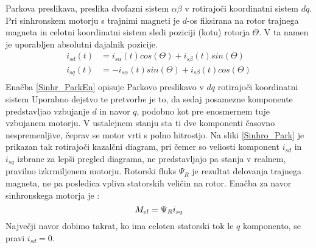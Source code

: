 \documentclass[a4paper,twoside,openright,12pt]{book}
\begin{document}
Parkova preslikava, preslika dvofazni sistem $\alpha \beta$ v rotirajoči koordinatni sistem $dq$. Pri sinhronskem motorju s trajnimi magneti je $d$-os fiksirana na rotor trajnega magneta in celotni koordinatni sistem sledi poziciji (kotu) rotorja $\Theta$. V ta namen je uporabljen absolutni dajalnik pozicije.\\
\begin{equation} \label{Sinhr_ParkEn}
\begin{aligned}
i_{sd}(t) &= i_{s\alpha}(t)cos(\Theta)+i_{s\beta}(t)sin(\Theta)\\[5pt]
i_{sq}(t) &= -i_{s\alpha}(t)sin(\Theta)+i_{s\beta}(t)cos(\Theta)\\[5pt]
\end{aligned}
\end{equation}
Enačba \ref{Sinhr_ParkEn} opisuje Parkovo preslikavo v $dq$ rotirajoči koordinatni sistem Uporabno dejstvo te pretvorbe je to, da sedaj posamezne komponente predstavljao vzbujanje $d$ in navor $q$, podobno kot pre enosmernem tuje vzbujanem motorju. V ustalejnem stanju sta ti dve komponenti časovno nespremenljive, čeprav se motor vrti s polno hitrostjo.
Na sliki \ref{Sinhro_Park} je prikazan tak rotirajoči kazalčni diagram, pri čemer so veliosti komponent $i_{sd}$ in $i_{sq}$ izbrane za lepši pregled diagrama, ne predstavljajo pa stanja v realnem, pravilno izkrmiljenem motorju. Rotorski fluks $\Psi_R$ je rezultat delovanja trajnega magneta, ne pa posledica vpliva statorskih veličin na rotor. Enačba za navor sinhronskega motorja je \cite{ambrovzivc1996sodobne}:
\begin{equation} \label{Sinhr_moment}
M_{el} = \Psi_Ri_{sq}\\[5pt]
\end{equation}
Največji navor dobimo takrat, ko ima celoten statorski tok le $q$ komponento, se pravi $i_{sd}=0$.
\end{document}
